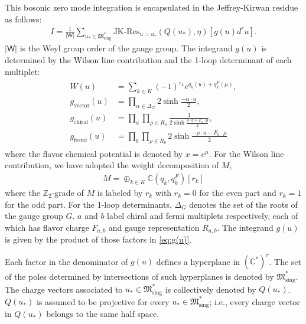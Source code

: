 \documentclass[a4paper,11pt]{article}
\begin{document}
This bosonic zero mode integration is encapsulated in the Jeffrey-Kirwan residue \cite{1993alg.geom..7001J} as follows:
\begin{align}
\label{eq:JK}
I = \frac{1}{|\mathsf W|} \sum_{u_* \in \mathfrak M_\text{sing}^*} \text{JK-Res}_{u = u_*} (Q(u_*),\eta) \left[g(u) d^r u\right].
\end{align}
$|\mathsf W|$ is the Weyl group order of the gauge group. The integrand $g(u)$ is determined by the Wilson line contribution and the 1-loop determinant of each multiplet:
\begin{align}
\begin{aligned}
\label{eq:g(u)}
W(u) &= \sum_{k \in K} (-1)^{r_k} e^{q_k(u)+q_k^F(\mu)}, \\
g_\text{vector}(u) &= \prod_{\alpha \in \Delta_G} 2 \sinh \frac{-\alpha \cdot u}{2}, \\
g_\text{chiral}(u) &= \prod_a \prod_{\rho \in R_a} \frac{1}{2 \sinh \frac{\rho \cdot u+F_a \cdot \mu}{2}}, \\
g_\text{fermi}(u) &= \prod_b \prod_{\rho \in R_b} 2 \sinh \frac{-\rho \cdot u-F_a \cdot \mu}{2}
\end{aligned}
\end{align}
where the flavor chemical potential is denoted by $x = e^\mu$. For the Wilson line contribution, we have adopted the weight decomposition of $M$,
\begin{align}
M = \oplus_{k \in K} \mathbb C \left(q_k,q_k^F\right) [r_k]
\end{align}
where the $\mathbb Z_2$-grade of $M$ is labeled by $r_k$ with $r_k = 0$ for the even part and $r_k = 1$ for the odd part. For the 1-loop determinants, $\Delta_G$ denotes the set of the roots of the gauge group $G$. $a$ and $b$ label chiral and fermi multiplets respectively, each of which has flavor charge $F_{a,b}$ and gauge representation $R_{a,b}$. The integrand $g(u)$ is given by the product of those factors in \eqref{eq:g(u)}.

Each factor in the denominator of $g(u)$ defines a hyperplane in $(\mathbb C^*)^r$. The set of the poles determined by intersections of such hyperplanes is denoted by $\mathfrak M_\text{sing}^*$. The charge vectors associated to $u_* \in \mathfrak M_\text{sing}^*$ is collectively denoted by $Q(u_*)$. $Q(u_*)$ is assumed to be projective for every $u_* \in \mathfrak M_\text{sing}^*$; i.e., every charge vector in $Q(u_*)$ belongs to the same half space.
\end{document}
